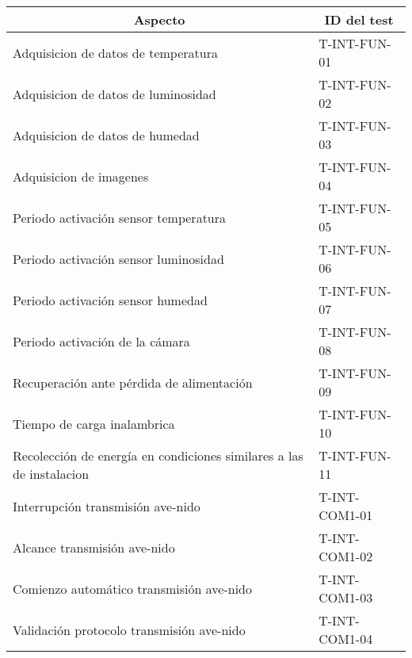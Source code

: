 \begin{table}[H]
\centering
\begin{tabular}{|l|l|}
\hline
\multicolumn{1}{|c|}{\textbf{Aspecto}}                               & \multicolumn{1}{c|}{\textbf{ID del test}} \\ \hline
Adquisicion de datos de temperatura                                  & T-INT-FUN-01                              \\ \hline
Adquisicion de datos de luminosidad                                  & T-INT-FUN-02                              \\ \hline
Adquisicion de datos de humedad                                      & T-INT-FUN-03                              \\ \hline
Adquisicion de imagenes                                              & T-INT-FUN-04                              \\ \hline
Periodo activación sensor temperatura                                & T-INT-FUN-05                              \\ \hline
Periodo activación sensor luminosidad                                & T-INT-FUN-06                              \\ \hline
Periodo activación sensor humedad                                    & T-INT-FUN-07                              \\ \hline
Periodo activación de la cámara                                      & T-INT-FUN-08                              \\ \hline
Recuperación ante pérdida de alimentación                            & T-INT-FUN-09                              \\ \hline
Tiempo de carga inalambrica                                          & T-INT-FUN-10                              \\ \hline
Recolección de energía en condiciones similares a las de instalacion & T-INT-FUN-11                              \\ \hline
Interrupción transmisión ave-nido                                    & T-INT-COM1-01                             \\ \hline
Alcance transmisión ave-nido                                         & T-INT-COM1-02                             \\ \hline
Comienzo automático transmisión ave-nido                             & T-INT-COM1-03                             \\ \hline
Validación protocolo transmisión ave-nido                            & T-INT-COM1-04                             \\ \hline

\end{tabular}
\end{table}
